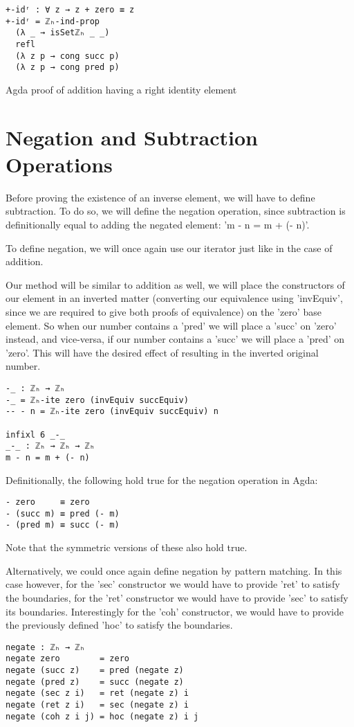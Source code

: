 \begin{listing}[H]
\begin{verbatim}
+-idʳ : ∀ z → z + zero ≡ z
+-idʳ = ℤₕ-ind-prop
  (λ _ → isSetℤₕ _ _)
  refl
  (λ z p → cong succ p)
  (λ z p → cong pred p)
\end{verbatim}
\caption{Agda proof of addition having a right identity element}
\end{listing}

\section{Negation and Subtraction Operations}
Before proving the existence of an inverse element, we will have to define subtraction. To do so, we will define the negation operation, since subtraction is definitionally equal to adding the negated element: 'm - n = m + (- n)'.

To define negation, we will once again use our iterator just like in the case of addition.

Our method will be similar to addition as well, we will place the constructors of our element in an inverted matter (converting our equivalence using 'invEquiv', since we are required to give both proofs of equivalence) on the 'zero' base element. So when our number contains a 'pred' we will place a 'succ' on 'zero' instead, and vice-versa, if our number contains a 'succ' we will place a 'pred' on 'zero'. This will have the desired effect of resulting in the inverted original number.

\begin{verbatim}
-_ : ℤₕ → ℤₕ
-_ = ℤₕ-ite zero (invEquiv succEquiv)
-- - n = ℤₕ-ite zero (invEquiv succEquiv) n

infixl 6 _-_
_-_ : ℤₕ → ℤₕ → ℤₕ
m - n = m + (- n)
\end{verbatim}

Definitionally, the following hold true for the negation operation in Agda:
\begin{verbatim}
- zero     ≡ zero
- (succ m) ≡ pred (- m)
- (pred m) ≡ succ (- m)
\end{verbatim}
Note that the symmetric versions of these also hold true.

Alternatively, we could once again define negation by pattern matching. In this case however, for the 'sec' constructor we would have to provide 'ret' to satisfy the boundaries, for the 'ret' constructor we would have to provide 'sec' to satisfy its boundaries. Interestingly for the 'coh' constructor, we would have to provide the previously defined 'hoc' to satisfy the boundaries.
\begin{verbatim}
negate : ℤₕ → ℤₕ
negate zero        = zero
negate (succ z)    = pred (negate z)
negate (pred z)    = succ (negate z)
negate (sec z i)   = ret (negate z) i
negate (ret z i)   = sec (negate z) i
negate (coh z i j) = hoc (negate z) i j
\end{verbatim}


